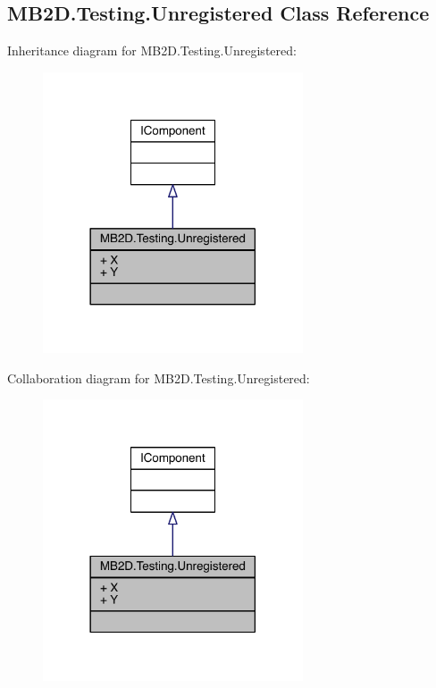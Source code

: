 \hypertarget{class_m_b2_d_1_1_testing_1_1_unregistered}{}\subsection{M\+B2\+D.\+Testing.\+Unregistered Class Reference}
\label{class_m_b2_d_1_1_testing_1_1_unregistered}


Inheritance diagram for M\+B2\+D.\+Testing.\+Unregistered\+:
\nopagebreak
\begin{figure}[H]
\begin{center}
\leavevmode
\includegraphics[width=218pt]{class_m_b2_d_1_1_testing_1_1_unregistered__inherit__graph}
\end{center}
\end{figure}


Collaboration diagram for M\+B2\+D.\+Testing.\+Unregistered\+:
\nopagebreak
\begin{figure}[H]
\begin{center}
\leavevmode
\includegraphics[width=218pt]{class_m_b2_d_1_1_testing_1_1_unregistered__coll__graph}
\end{center}
\end{figure}
